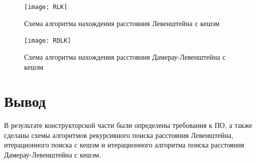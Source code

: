 \clearpage

\begin{figure}
	\centering
	\texttt{[image: RLK]}
	\caption{Схема алгоритма нахождения расстояния Левенштейна с кешэм}
	\label{fig:RLK}
\end{figure}

\clearpage

\begin{figure}
	\centering
	\texttt{[image: RDLK]}
	\caption{Схема алгоритма нахождения расстояния Дамерау-Левенштейна с кешэм}
	\label{fig:RDLK}
\end{figure}

\clearpage

\section{Вывод}

В результате конструкторской части были определены требования к ПО, а также сделаны схемы алгоритмов рекурсивного поиска расстояния Левенштейна, итерационного поиска с кешэм и итерационного алгоритма поиска расстояния Дамерау-Левенштейна с кешэм.

\clearpage
